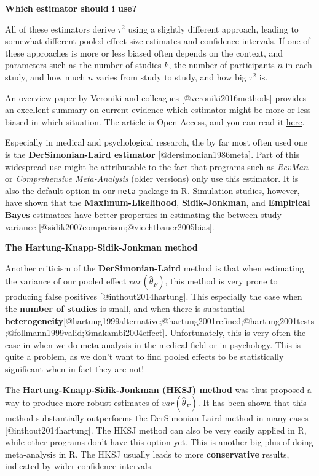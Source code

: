 \documentclass[]{book}
\theoremstyle{definition}
\theoremstyle{definition}
\theoremstyle{definition}
\theoremstyle{remark}
\begin{document}
\begin{rmdinfo}
\textbf{Which estimator should i use?}

All of these estimators derive \(\tau^{2}\) using a slightly different
approach, leading to somewhat different pooled effect size estimates and
confidence intervals. If one of these approaches is more or less biased
often depends on the context, and parameters such as the number of
studies \(k\), the number of participants \(n\) in each study, and how
much \(n\) varies from study to study, and how big \(\tau^{2}\) is.

An overview paper by Veroniki and colleagues {[}@veroniki2016methods{]}
provides an excellent summary on current evidence which estimator might
be more or less biased in which situation. The article is Open Access,
and you can read it
\href{https://www.ncbi.nlm.nih.gov/pmc/articles/PMC4950030/}{here}.

Especially in medical and psychological research, the by far most often
used one is the \textbf{DerSimonian-Laird estimator}
{[}@dersimonian1986meta{]}. Part of this widespread use might be
attributable to the fact that programs such as \emph{RevMan} or
\emph{Comprehensive Meta-Analysis} (older versions) only use this
estimator. It is also the default option in our \texttt{meta} package in
R. Simulation studies, however, have shown that the
\textbf{Maximum-Likelihood}, \textbf{Sidik-Jonkman}, and
\textbf{Empirical Bayes} estimators have better properties in estimating
the between-study variance
{[}@sidik2007comparison;@viechtbauer2005bias{]}.
\end{rmdinfo}

\begin{rmdinfo}
\textbf{The Hartung-Knapp-Sidik-Jonkman method}

Another criticism of the \textbf{DerSimonian-Laird} method is that when
estimating the variance of our pooled effect \(var(\hat\theta_F)\), this
method is very prone to producing false positives
{[}@inthout2014hartung{]}. This especially the case when the
\textbf{number of studies} is small, and when there is substantial
\textbf{heterogeneity}{[}@hartung1999alternative;@hartung2001refined;@hartung2001tests;@follmann1999valid;@makambi2004effect{]}.
Unfortunately, this is very often the case in when we do meta-analysis
in the medical field or in psychology. This is quite a problem, as we
don't want to find pooled effects to be statistically significant when
in fact they are not!

The \textbf{Hartung-Knapp-Sidik-Jonkman (HKSJ) method} was thus proposed
a way to produce more robust estimates of \(var(\hat\theta_F)\). It has
been shown that this method substantially outperforms the
DerSimonian-Laird method in many cases {[}@inthout2014hartung{]}. The
HKSJ method can also be very easily applied in R, while other programs
don't have this option yet. This is another big plus of doing
meta-analysis in R. The HKSJ usually leads to more \textbf{conservative}
results, indicated by wider confidence intervals.
\end{rmdinfo}
\end{document}
